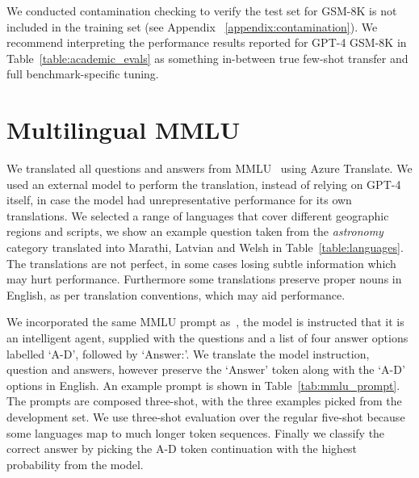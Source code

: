 \documentclass{article}
\begin{document}
We conducted contamination checking to verify the test set for GSM-8K is not included in the training set (see Appendix ~\ref{appendix:contamination}). We recommend interpreting the performance results reported for GPT-4 GSM-8K in Table~\ref{table:academic_evals} as something in-between true few-shot transfer and full benchmark-specific tuning. 

\section{Multilingual MMLU}
We translated all questions and answers from MMLU~\citep{hendrycks20mmlu} using Azure Translate. We used an external model to perform the translation, instead of relying on GPT-4 itself, in case the model had unrepresentative performance for its own translations. We selected a range of languages that cover different geographic regions and scripts, we show an example question taken from the \textit{astronomy} category translated into Marathi, Latvian and Welsh in Table~\ref{table:languages}. The translations are not perfect, in some cases losing subtle information which may hurt performance. Furthermore some translations preserve proper nouns in English, as per translation conventions, which may aid performance. 

We incorporated the same MMLU prompt as~\citep{rae2021scaling}, the model is instructed that it is an intelligent agent, supplied with the questions and a list of four answer options labelled `A-D', followed by `Answer:'. We translate the model instruction, question and answers, however preserve the `Answer' token along with the `A-D' options in English. An example prompt is shown in Table~\ref{tab:mmlu_prompt}. The prompts are composed three-shot, with the three examples picked from the development set. We use three-shot evaluation over the regular five-shot because some languages map to much longer token sequences. Finally we classify the correct answer by picking the A-D token continuation with the highest probability from the model.
\label{appendix:mmludetails}
\end{document}
